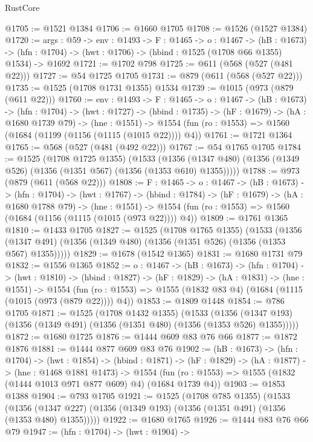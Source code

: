 \begin{lexlean}{RustCore}
\begin{coremodule}
@1705 := @1521 @1384
@1706 := @1660 @1705
@1708 := @1526 (@1527 @1384)
@1720 := {args : @59} ->
  {env : @1493} ->
  {F : @1465} ->
  {o : @1467} ->
  (hB : @1673) -> (hfn : @1704) -> (hwt : @1706) -> (hbind : @1525 (@1708 @66 @1355) @1534) -> @1692
@1721 := @1702 @798
@1725 := @611 (@568 (@527 (@481 @22)))
@1727 := @54 @1725 @1705
@1731 := @879 (@611 (@568 (@527 @22)))
@1735 := @1525 (@1708 @1731 @1355) @1534
@1739 := @1015 (@973 (@879 (@611 @22)))
@1760 := {env : @1493} ->
  {F : @1465} ->
  {o : @1467} ->
  (hB : @1673) ->
  (hfn : @1704) ->
  (hwt : @1727) ->
  (hbind : @1735) ->
  (hF : @1679) ->
  (hA : @1680 @1739 @79) ->
  (hne : @1551) -> @1554 (fun (ro : @1553) => @1560 (@1684 (@1199 (@1156 (@1115 (@1015 @22)))) @4))
@1761 := @1721 @1364
@1765 := @568 (@527 (@481 (@492 @22)))
@1767 := @54 @1765 @1705
@1784 := @1525
    (@1708 @1725 @1355)
    (@1533
      (@1356 (@1347 @480) (@1356 (@1349 @526) (@1356 (@1351 @567) (@1356 (@1353 @610) @1355)))))
@1788 := @973 (@879 (@611 (@568 @22)))
@1808 := {F : @1465} ->
  {o : @1467} ->
  (hB : @1673) ->
  (hfn : @1704) ->
  (hwt : @1767) ->
  (hbind : @1784) ->
  (hF : @1679) ->
  (hA : @1680 @1788 @79) ->
  (hne : @1551) -> @1554 (fun (ro : @1553) => @1560 (@1684 (@1156 (@1115 (@1015 (@973 @22)))) @4))
@1809 := @1761 @1365
@1810 := @1433 @1705
@1827 := @1525
    (@1708 @1765 @1355)
    (@1533
      (@1356 (@1347 @491) (@1356 (@1349 @480) (@1356 (@1351 @526) (@1356 (@1353 @567) @1355)))))
@1829 := @1678 (@1542 @1365)
@1831 := @1680 @1731 @79
@1832 := @1556 @1365
@1852 := {o : @1467} ->
  (hB : @1673) ->
  (hfn : @1704) ->
  (hwt : @1810) ->
  (hbind : @1827) ->
  (hF : @1829) ->
  (hA : @1831) ->
  (hne : @1551) ->
  @1554 (fun (ro : @1553) => @1555 (@1832 @83 @4) (@1684 (@1115 (@1015 (@973 (@879 @22)))) @4))
@1853 := @1809 @1448
@1854 := @786 @1705
@1871 := @1525
    (@1708 @1432 @1355)
    (@1533
      (@1356 (@1347 @193) (@1356 (@1349 @491) (@1356 (@1351 @480) (@1356 (@1353 @526) @1355)))))
@1872 := @1680 @1725
@1876 := @1444 @609 @83 @76 @66
@1877 := @1872 @1876
@1881 := @1444 @877 @609 @83 @76
@1902 := (hB : @1673) ->
  (hfn : @1704) ->
  (hwt : @1854) ->
  (hbind : @1871) ->
  (hF : @1829) ->
  (hA : @1877) ->
  (hne : @1468 @1881 @1473) ->
  @1554 (fun (ro : @1553) => @1555 (@1832 (@1444 @1013 @971 @877 @609) @4) (@1684 @1739 @4))
@1903 := @1853 @1388
@1904 := @793 @1705
@1921 := @1525
    (@1708 @785 @1355)
    (@1533
      (@1356 (@1347 @227) (@1356 (@1349 @193) (@1356 (@1351 @491) (@1356 (@1353 @480) @1355)))))
@1922 := @1680 @1765
@1926 := @1444 @83 @76 @66 @79
@1947 := (hfn : @1704) ->
  (hwt : @1904) ->

\end{coremodule}
\end{lexlean}
